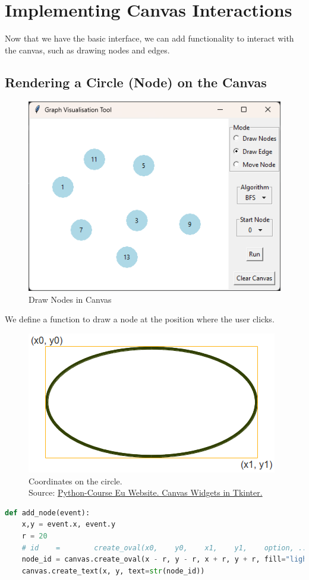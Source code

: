 \documentclass{article}
\begin{document}
\section{Implementing Canvas Interactions}

Now that we have the basic interface, we can add functionality to interact with the canvas, such as drawing nodes and edges.

\subsection{Rendering a Circle (Node) on the Canvas}

\begin{figure}[h]
    \centering
    \includegraphics[width=0.5\linewidth]{images/draw_nodes.png}
    \caption{Draw Nodes in Canvas}
    \label{fig:draw_canvas}
\end{figure}
We define a function to draw a node at the position where the user clicks.

\begin{figure}
    \centering
    \includegraphics[width=0.5\linewidth]{images/canvas_oval.png}
    \caption{Coordinates on the circle.\\ Source: \href{https://python-course.eu/tkinter/canvas-widgets-in-tkinter.php}{Python-Course Eu Website. Canvas Widgets in Tkinter.}}
    \label{fig:enter-label}
\end{figure}
\begin{lstlisting}[language=Python]
def add_node(event):
    x,y = event.x, event.y
    r = 20
    # id    =        create_oval(x0,    y0,    x1,    y1,    option, ...)
    node_id = canvas.create_oval(x - r, y - r, x + r, y + r, fill="lightblue", outline="lightblue")
    canvas.create_text(x, y, text=str(node_id))
\end{lstlisting}
\end{document}
